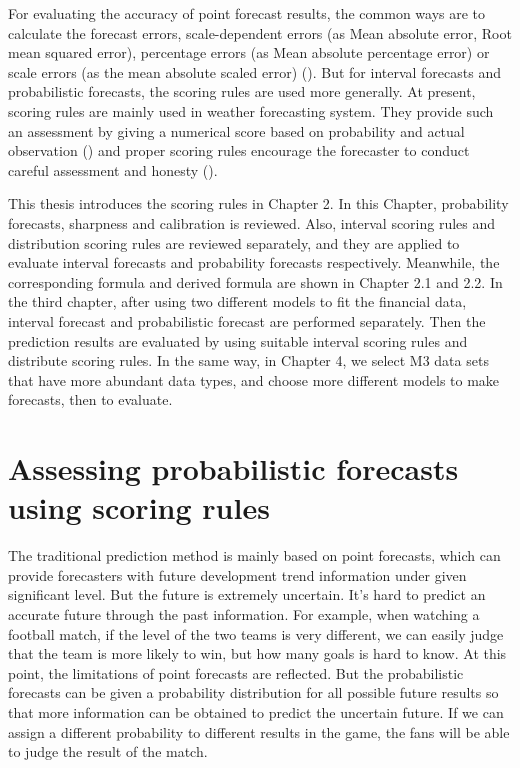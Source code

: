 \documentclass{monashthesis}
\theoremstyle{definition}
\theoremstyle{definition}
\theoremstyle{definition}
\theoremstyle{remark}
\begin{document}
For evaluating the accuracy of point forecast results, the common ways
are to calculate the forecast errors, scale-dependent errors (as Mean
absolute error, Root mean squared error), percentage errors (as Mean
absolute percentage error) or scale errors (as the mean absolute scaled
error) (\textcite{RA18}). But for interval forecasts and probabilistic
forecasts, the scoring rules are used more generally. At present,
scoring rules are mainly used in weather forecasting system. They
provide such an assessment by giving a numerical score based on
probability and actual observation (\textcite{W96}) and proper scoring
rules encourage the forecaster to conduct careful assessment and honesty
(\textcite{GR07}).

This thesis introduces the scoring rules in Chapter 2. In this Chapter,
probability forecasts, sharpness and calibration is reviewed. Also,
interval scoring rules and distribution scoring rules are reviewed
separately, and they are applied to evaluate interval forecasts and
probability forecasts respectively. Meanwhile, the corresponding formula
and derived formula are shown in Chapter 2.1 and 2.2. In the third
chapter, after using two different models to fit the financial data,
interval forecast and probabilistic forecast are performed separately.
Then the prediction results are evaluated by using suitable interval
scoring rules and distribute scoring rules. In the same way, in Chapter
4, we select M3 data sets that have more abundant data types, and choose
more different models to make forecasts, then to evaluate.

\chapter{Assessing probabilistic forecasts using scoring
rules}\label{assessing-probabilistic-forecasts-using-scoring-rules}

The traditional prediction method is mainly based on point forecasts,
which can provide forecasters with future development trend information
under given significant level. But the future is extremely uncertain.
It's hard to predict an accurate future through the past information.
For example, when watching a football match, if the level of the two
teams is very different, we can easily judge that the team is more
likely to win, but how many goals is hard to know. At this point, the
limitations of point forecasts are reflected. But the probabilistic
forecasts can be given a probability distribution for all possible
future results so that more information can be obtained to predict the
uncertain future. If we can assign a different probability to different
results in the game, the fans will be able to judge the result of the
match.
\end{document}
